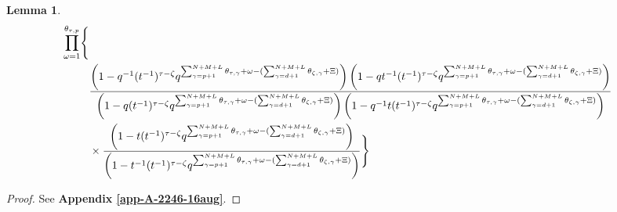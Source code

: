 \documentclass[12pt,reqno,a4paper]{amsart}
\numberwithin{equation}{section}
\newtheorem{lem}[thm]{Lemma}
\theoremstyle{definition}
\begin{document}
\begin{lem}
\begin{align}
	\prod_{\omega = 1}^{\theta_{\tau,p}}
	\Biggl\{
	\notag 
	\\
	&\frac{
		\left(	1 - q^{-1}					
		(t^{-1})^{\tau - \zeta} q^{	\sum_{\gamma = p + 1}^{N + M + L} \theta_{\tau,\gamma}	+ \omega	- (\sum_{\gamma = d + 1}^{N + M + L} \theta_{\zeta,\gamma} + \Xi)		}	
		\right)
		\left(	1 - qt^{-1}			
		(t^{-1})^{\tau - \zeta} q^{	\sum_{\gamma = p + 1}^{N + M + L} \theta_{\tau,\gamma}	+ \omega	- (\sum_{\gamma = d + 1}^{N + M + L} \theta_{\zeta,\gamma} + \Xi)		}
		\right)
	}{
		\left(	1 - q			
		(t^{-1})^{\tau - \zeta} q^{	\sum_{\gamma = p + 1}^{N + M + L} \theta_{\tau,\gamma}	+ \omega	- (\sum_{\gamma = d + 1}^{N + M + L} \theta_{\zeta,\gamma} + \Xi)		}
		\right)
		\left(	1 - q^{-1}t			
		(t^{-1})^{\tau - \zeta} q^{	\sum_{\gamma = p + 1}^{N + M + L} \theta_{\tau,\gamma}	+ \omega	- (\sum_{\gamma = d + 1}^{N + M + L} \theta_{\zeta,\gamma} + \Xi)		}
		\right)
	}
	\notag 
	\\
	&\times
	\frac{
		\left(	1 - t		
		(t^{-1})^{\tau - \zeta} q^{	\sum_{\gamma = p + 1}^{N + M + L} \theta_{\tau,\gamma}	+ \omega	- (\sum_{\gamma = d + 1}^{N + M + L} \theta_{\zeta,\gamma} + \Xi)		}
		\right)
	}{
		\left(	1 - t^{-1}			
		(t^{-1})^{\tau - \zeta} q^{	\sum_{\gamma = p + 1}^{N + M + L} \theta_{\tau,\gamma}	+ \omega	- (\sum_{\gamma = d + 1}^{N + M + L} \theta_{\zeta,\gamma} + \Xi)		}
		\right)
	}
	\Biggr\}
	\notag 
\end{align}
\normalsize
\end{lem}
\begin{proof}
See \textbf{Appendix \ref{app-A-2246-16aug}}. 
\end{proof}
\end{document}
